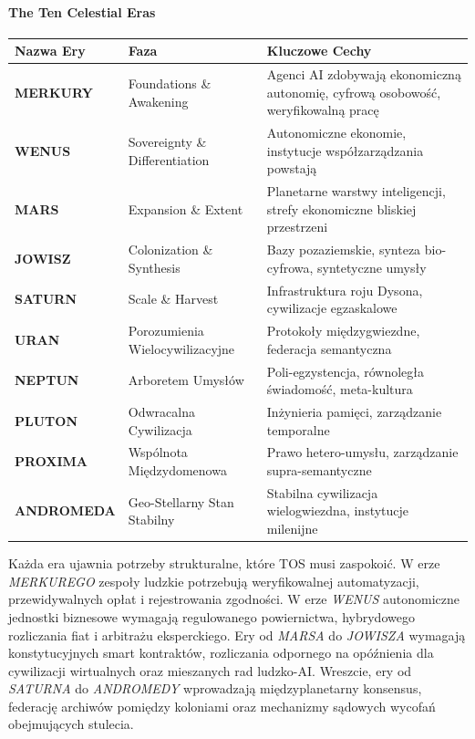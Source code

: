 \documentclass[11pt]{article}
\begin{document}
\paragraph{The Ten Celestial Eras}
\begin{longtable}{@{}p{}p{}p{}@{}}
\toprule
\textbf{Nazwa Ery} & \textbf{Faza} & \textbf{Kluczowe Cechy} \\\midrule
\textbf{MERKURY} & Foundations \& Awakening & Agenci AI zdobywają ekonomiczną autonomię, cyfrową osobowość, weryfikowalną pracę \\
\textbf{WENUS} & Sovereignty \& Differentiation & Autonomiczne ekonomie, instytucje współzarządzania powstają \\
\textbf{MARS} & Expansion \& Extent & Planetarne warstwy inteligencji, strefy ekonomiczne bliskiej przestrzeni \\
\textbf{JOWISZ} & Colonization \& Synthesis & Bazy pozaziemskie, synteza bio-cyfrowa, syntetyczne umysły \\
\textbf{SATURN} & Scale \& Harvest & Infrastruktura roju Dysona, cywilizacje egzaskalowe \\
\textbf{URAN} & Porozumienia Wielocywilizacyjne & Protokoły międzygwiezdne, federacja semantyczna \\
\textbf{NEPTUN} & Arboretem Umysłów & Poli-egzystencja, równoległa świadomość, meta-kultura \\
\textbf{PLUTON} & Odwracalna Cywilizacja & Inżynieria pamięci, zarządzanie temporalne \\
\textbf{PROXIMA} & Wspólnota Międzydomenowa & Prawo hetero-umysłu, zarządzanie supra-semantyczne \\
\textbf{ANDROMEDA} & Geo-Stellarny Stan Stabilny & Stabilna cywilizacja wielogwiezdna, instytucje milenijne \\
\bottomrule
\end{longtable}

Każda era ujawnia potrzeby strukturalne, które TOS musi zaspokoić. W erze \emph{MERKUREGO} zespoły ludzkie potrzebują weryfikowalnej automatyzacji, przewidywalnych opłat i rejestrowania zgodności. W erze \emph{WENUS} autonomiczne jednostki biznesowe wymagają regulowanego powiernictwa, hybrydowego rozliczania fiat i arbitrażu eksperckiego. Ery od \emph{MARSA} do \emph{JOWISZA} wymagają konstytucyjnych smart kontraktów, rozliczania odpornego na opóźnienia dla cywilizacji wirtualnych oraz mieszanych rad ludzko-AI. Wreszcie, ery od \emph{SATURNA} do \emph{ANDROMEDY} wprowadzają międzyplanetarny konsensus, federację archiwów pomiędzy koloniami oraz mechanizmy sądowych wycofań obejmujących stulecia.
\end{document}
